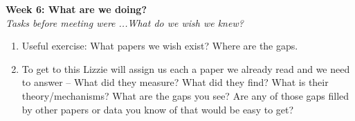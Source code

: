 \documentclass[11pt,letter]{article}
\begin{document}
\vspace{3ex}

{\bf Week 6: What are we doing?}\\

\emph{Tasks before meeting were ...What do we wish we knew?}
\begin{enumerate}
\item Useful exercise: What papers we wish exist? Where are the gaps. 
\item To get to this Lizzie will assign us each a paper we already read and we need to answer -- What did they measure? What did they find? What is their theory/mechanisms? What are the gaps you see? Are any of those gaps filled by other papers or data you know of that would be easy to get? 
\end{enumerate}
\end{document}
